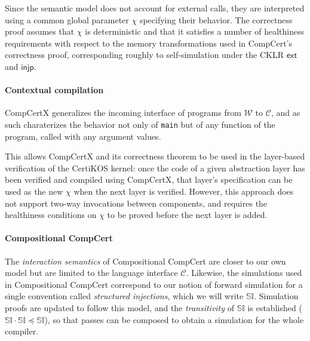 \documentclass[sigplan,10pt,review,anonymous]{acmart}
\newcommand{\kw}[1]{\ensuremath{ \mathsf{#1} }}
\newcommand{\scref}{\preceq}
\begin{document}
Since the semantic model does not account
for external calls,
they are interpreted %
using a common global parameter $\chi$
specifying their behavior.
The correctness proof assumes that $\chi$ is deterministic
and that it satisfies a number of healthiness requirements
with respect to the memory transformations
used in CompCert's correctness proof,
corresponding roughly to self-simulation
under the CKLR $\kw{ext}$ and $\kw{injp}$.


\paragraph{Contextual compilation} %

CompCertX \cite{popl15} generalizes
the incoming interface of programs
from $\mathcal{W}$ to $\mathcal{C}$,
and as such charaterizes the behavior
not only of \texttt{main}
but of any function of the program,
called with any argument values.

This allows CompCertX and its correctness theorem
to be used in the layer-based verification of
the CertiKOS kernel:
once the code of a given abstraction layer has been verified
and compiled using CompCertX,
that layer's specification can be used as the new $\chi$
when the next layer is verified.
However,
this approach does not support two-way invocations between components,
and requires the healthiness conditions on $\chi$
to be proved before the next layer is added.


\paragraph{Compositional CompCert} %

The \emph{interaction semantics} of
Compositional CompCert \cite{compcompcert}
are closer to our own model
but are limited to the language interface $\mathcal{C}$.
Likewise, the simulations used in Compositional CompCert
correspond to our notion of forward simulation
for a single convention called \emph{structured injections},
which we will write $\mathbb{SI}$.
Simulation proofs are updated to follow this model,
and the \emph{transitivity} of $\mathbb{SI}$ is established
($\mathbb{SI} \cdot \mathbb{SI} \scref \mathbb{SI}$),
so that passes can be composed
to obtain a simulation for the whole compiler.
\end{document}
